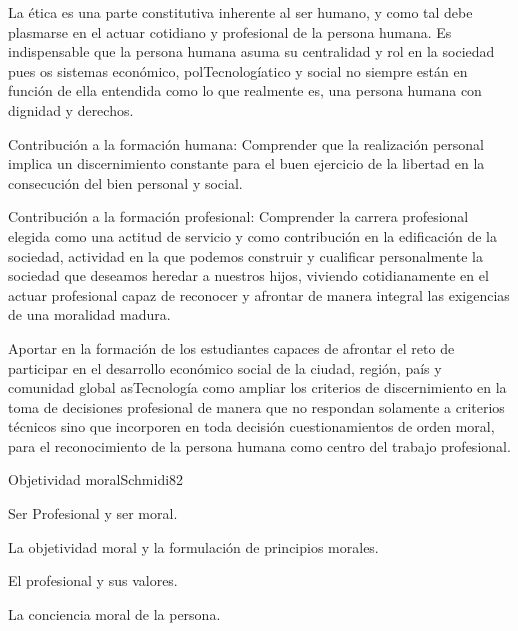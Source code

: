 \begin{syllabus}


\begin{justification}
La ética es una parte constitutiva inherente al ser humano, y  como tal debe plasmarse en el 
actuar cotidiano y profesional de la persona humana. Es indispensable que la persona humana 
asuma su centralidad y rol en la sociedad pues os sistemas económico, polTecnologíatico y social no 
siempre están en función de ella entendida como lo que realmente es, una persona humana con 
dignidad y derechos.

Contribución a la formación humana: Comprender que la realización personal implica  un 
discernimiento constante para el buen ejercicio de la libertad en la consecución del bien 
personal y social.

Contribución a la formación profesional: Comprender la carrera profesional elegida como 
una actitud de servicio y como contribución en la edificación de la sociedad, actividad 
en la que podemos construir  y cualificar personalmente la sociedad que deseamos heredar 
a nuestros hijos, viviendo cotidianamente en el actuar profesional capaz de reconocer y 
afrontar de manera integral las exigencias de una moralidad madura.

\end{justification}

\begin{goals}
\item Aportar en la formación de los estudiantes capaces de afrontar el reto de participar 
en el desarrollo económico social de la ciudad, región, país y comunidad global asTecnología 
como ampliar los criterios de discernimiento en la toma de decisiones profesional de 
manera que no respondan solamente a criterios técnicos sino que incorporen en toda 
decisión cuestionamientos de orden moral, para el reconocimiento de la persona 
humana como centro del trabajo profesional.
\end{goals}

\begin{outcomes}
\end{outcomes}

\begin{unit}{Objetividad moral}{Schmidi}{8}{2}
\begin{topics}
      \item Ser Profesional y ser moral.
      \item La objetividad moral y la formulación de principios morales.
      \item El profesional y sus valores.
      \item La conciencia moral de la persona.
\end{topics}


\end{unit}
\end{syllabus}
